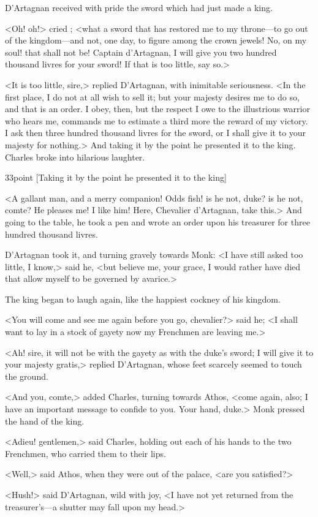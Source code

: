 D'Artagnan received with pride the sword which had just made a king.

<Oh! oh!> cried ; <what a sword that has restored me to my throne—to go out of the kingdom—and not, one day, to figure among the crown jewels! No, on my soul! that shall not be! Captain d'Artagnan, I will give you two hundred thousand livres for your sword! If that is too little, say so.>

<It is too little, sire,> replied D'Artagnan, with inimitable seriousness. <In the first place, I do not at all wish to sell it; but your majesty desires me to do so, and that is an order. I obey, then, but the respect I owe to the illustrious warrior who hears me, commands me to estimate a third more the reward of my victory. I ask then three hundred thousand livres for the sword, or I shall give it to your majesty for nothing.> And taking it by the point he presented it to the king. Charles broke into hilarious laughter.

\begin{bwbigpic}
	[\basicscale] 
	{33point}
	[Taking it by the point he presented it to the king]
\end{bwbigpic}

<A gallant man, and a merry companion! Odds fish! is he not, duke? is he not, comte? He pleases me! I like him! Here, Chevalier d'Artagnan, take this.> And going to the table, he took a pen and wrote an order upon his treasurer for three hundred thousand livres.

D'Artagnan took it, and turning gravely towards Monk: <I have still asked too little, I know,> said he, <but believe me, your grace, I would rather have died that allow myself to be governed by avarice.>

The king began to laugh again, like the happiest cockney of his kingdom.

<You will come and see me again before you go, chevalier?> said he; <I shall want to lay in a stock of gayety now my Frenchmen are leaving me.>

<Ah! sire, it will not be with the gayety as with the duke's sword; I will give it to your majesty gratis,> replied D'Artagnan, whose feet scarcely seemed to touch the ground.

<And you, comte,> added Charles, turning towards Athos, <come again, also; I have an important message to confide to you. Your hand, duke.> Monk pressed the hand of the king.

<Adieu! gentlemen,> said Charles, holding out each of his hands to the two Frenchmen, who carried them to their lips.

<Well,> said Athos, when they were out of the palace, <are you satisfied?>

<Hush!> said D'Artagnan, wild with joy, <I have not yet returned from the treasurer's—a shutter may fall upon my head.> 